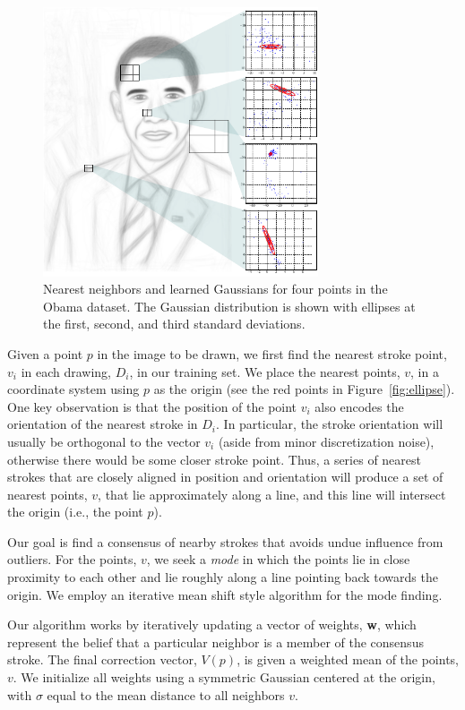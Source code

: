 \begin{figure}
  \centering%
  \includegraphics[width=3.2in]{figures/nearest-neighbor-plots.pdf}
  \caption{Nearest neighbors and learned Gaussians for four points in the Obama dataset.  The Gaussian distribution is shown with ellipses at the first, second, and third standard deviations.}
  \label{fig:neighbors}
\end{figure}


Given a point $p$ in the image to be drawn, we first find the nearest stroke point, $v_i$ in each drawing, $D_i$, in our training set. We place the nearest points, $v$, in a coordinate system using $p$ as the origin (see the red points in Figure~\ref{fig:ellipse}). One key observation is that the position of the point $v_i$ also encodes the orientation of the nearest stroke in $D_i$. In particular, the stroke orientation will usually be orthogonal to the vector $v_i$ (aside from minor discretization noise), otherwise there would be some closer stroke point. Thus, a series of nearest strokes that are closely aligned in position and orientation will produce a set of nearest points, $v$, that lie approximately along a line, and this line will intersect the origin (i.e., the point $p$).

Our goal is find a consensus of nearby strokes that avoids undue influence from outliers. For the points, $v$, we seek a {\em mode} in which the points lie in close proximity to each other and lie roughly along a line pointing back towards the origin. We employ an iterative mean shift style algorithm for the mode finding.

Our algorithm works by iteratively updating a vector of weights, {\bf w}, which represent the belief that a particular neighbor is a member of the consensus stroke. The final correction vector, $V(p)$, is given a weighted mean of the points, $v$. We initialize all weights using a symmetric Gaussian centered at the origin, with $\sigma$ equal to the mean distance to all neighbors $v$.


